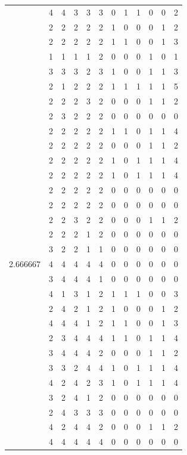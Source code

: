 \documentclass[]{book}
\theoremstyle{definition}
\theoremstyle{definition}
\theoremstyle{definition}
\theoremstyle{remark}
\begin{document}
\begin{table}
{\begin{tabular}[t]{rrrrrrrrrrrr}
 & 4 & 4 & 3 & 3 & 3 & 0 & 1 & 1 & 0 & 0 & 2\\
 & 2 & 2 & 2 & 2 & 2 & 1 & 0 & 0 & 0 & 1 & 2\\
 & 2 & 2 & 2 & 2 & 2 & 1 & 1 & 0 & 0 & 1 & 3\\
 & 1 & 1 & 1 & 1 & 2 & 0 & 0 & 0 & 1 & 0 & 1\\
 & 3 & 3 & 3 & 2 & 3 & 1 & 0 & 0 & 1 & 1 & 3\\
 & 2 & 1 & 2 & 2 & 2 & 1 & 1 & 1 & 1 & 1 & 5\\
 & 2 & 2 & 2 & 3 & 2 & 0 & 0 & 0 & 1 & 1 & 2\\
 & 2 & 3 & 2 & 2 & 2 & 0 & 0 & 0 & 0 & 0 & 0\\
 & 2 & 2 & 2 & 2 & 2 & 1 & 1 & 0 & 1 & 1 & 4\\
 & 2 & 2 & 2 & 2 & 2 & 0 & 0 & 0 & 1 & 1 & 2\\
 & 2 & 2 & 2 & 2 & 2 & 1 & 0 & 1 & 1 & 1 & 4\\
 & 2 & 2 & 2 & 2 & 2 & 1 & 0 & 1 & 1 & 1 & 4\\
 & 2 & 2 & 2 & 2 & 2 & 0 & 0 & 0 & 0 & 0 & 0\\
 & 2 & 2 & 2 & 2 & 2 & 0 & 0 & 0 & 0 & 0 & 0\\
 & 2 & 2 & 3 & 2 & 2 & 0 & 0 & 0 & 1 & 1 & 2\\
 & 2 & 2 & 2 & 1 & 2 & 0 & 0 & 0 & 0 & 0 & 0\\
 & 3 & 2 & 2 & 1 & 1 & 0 & 0 & 0 & 0 & 0 & 0\\
2.666667 & 4 & 4 & 4 & 4 & 4 & 0 & 0 & 0 & 0 & 0 & 0\\
 & 3 & 4 & 4 & 4 & 1 & 0 & 0 & 0 & 0 & 0 & 0\\
 & 4 & 1 & 3 & 1 & 2 & 1 & 1 & 1 & 0 & 0 & 3\\
 & 2 & 4 & 2 & 1 & 2 & 1 & 0 & 0 & 0 & 1 & 2\\
 & 4 & 4 & 4 & 1 & 2 & 1 & 1 & 0 & 0 & 1 & 3\\
 & 2 & 3 & 4 & 4 & 4 & 1 & 1 & 0 & 1 & 1 & 4\\
 & 3 & 4 & 4 & 4 & 2 & 0 & 0 & 0 & 1 & 1 & 2\\
 & 3 & 3 & 2 & 4 & 4 & 1 & 0 & 1 & 1 & 1 & 4\\
 & 4 & 2 & 4 & 2 & 3 & 1 & 0 & 1 & 1 & 1 & 4\\
 & 3 & 2 & 4 & 1 & 2 & 0 & 0 & 0 & 0 & 0 & 0\\
 & 2 & 4 & 3 & 3 & 3 & 0 & 0 & 0 & 0 & 0 & 0\\
 & 4 & 2 & 4 & 4 & 2 & 0 & 0 & 0 & 1 & 1 & 2\\
 & 4 & 4 & 4 & 4 & 4 & 0 & 0 & 0 & 0 & 0 & 0\\

\end{tabular}}
\end{table}
\end{document}
